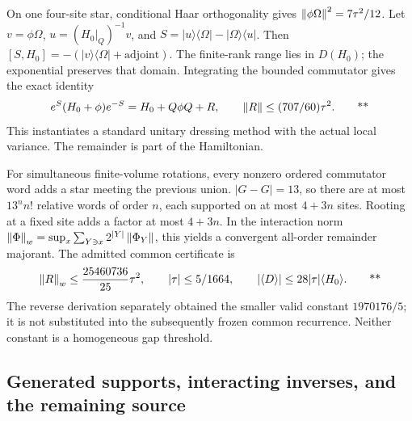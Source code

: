 On one four-site star, conditional Haar orthogonality gives
\(\left\lVert \phi\Omega\right\rVert^2=7\tau^2/12\).
Let \(v=\phi\Omega\), \(u=(H_0|_Q)^{-1}v\), and
\(S=|u\rangle\langle\Omega|-|\Omega\rangle\langle u|\).
Then \([S,H_0]=-(|v\rangle\langle\Omega|+\mathrm{adjoint})\).
The finite-rank range lies in \(D(H_0)\); the exponential preserves that
domain. Integrating the bounded commutator gives the exact identity
\[
 e^S(H_0+\phi)e^{-S}=H_0+Q\phi Q+R,\qquad
 \left\lVert R\right\rVert\le(707/60)\tau^2.
 \qquad\text{**}
\]
This instantiates a standard unitary dressing method with the actual
local variance. The remainder is part of the Hamiltonian.

For simultaneous finite-volume rotations, every nonzero ordered
commutator word adds a star meeting the previous union.
\(|G-G|=13\), so there are at most \(13^nn!\) relative words of order
\(n\), each supported on at most \(4+3n\) sites. Rooting at a fixed site
adds a factor at most \(4+3n\).
In the interaction norm
\(\left\lVert \Phi\right\rVert_w=\sup_x\sum_{Y\ni x}2^{|Y|}\left\lVert \Phi_Y\right\rVert\),
this yields a convergent all-order remainder majorant.
The admitted common certificate is
\begin{equation}
 \left\lVert R\right\rVert_w\le\frac{25460736}{25}\tau^2,\qquad
 |\tau|\le5/1664,\qquad
 |\langle D\rangle|\le28|\tau|\langle H_0\rangle.
 \qquad\text{**}
 \label{eq:middle-global-rotation}
\end{equation}
The reverse derivation separately obtained the smaller valid constant
\(1970176/5\); it is not substituted into the subsequently frozen common
recurrence. Neither constant is a homogeneous gap threshold.

\subsection{Generated supports, interacting inverses, and the remaining source \workstar}
\label{sec:middle-inverse}

